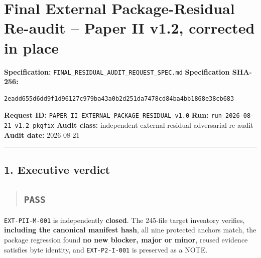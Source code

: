 \documentclass[
  10pt,
]{article}
\author{}
\date{}
\begin{document}
{
\setcounter{tocdepth}{3}
\tableofcontents
}
\section{Final External Package-Residual Re-audit -- Paper II v1.2,
corrected in
place}\label{final-external-package-residual-re-audit-paper-ii-v1.2-corrected-in-place}

\textbf{Specification:}
\texttt{FINAL\_RESIDUAL\_AUDIT\_REQUEST\_SPEC.md} \textbf{Specification
SHA-256:}

\begin{verbatim}
2eadd655d6dd9f1d96127c979ba43a0b2d251da7478cd84ba4bb1868e38cb683
\end{verbatim}

\textbf{Request ID:}
\texttt{PAPER\_II\_EXTERNAL\_PACKAGE\_RESIDUAL\_v1.0} \textbf{Run:}
\texttt{run\_2026-08-21\_v1.2\_pkgfix} \textbf{Audit class:} independent
external residual adversarial re-audit \textbf{Audit date:} 2026-08-21

\begin{center}\rule{0.5\linewidth}{0.5pt}\end{center}

\subsection{1. Executive verdict}\label{executive-verdict}

\begin{quote}
\mbox{}%
\subsection{\texorpdfstring{\texttt{PASS}}{PASS}}\label{pass}
\end{quote}

\texttt{EXT-PII-M-001} is independently \textbf{closed}. The 245-file
target inventory verifies, \textbf{including the canonical manifest
hash}, all nine protected anchors match, the package regression found
\textbf{no new blocker, major or minor}, reused evidence satisfies byte
identity, and \texttt{EXT-P2-I-001} is preserved as a NOTE.
\end{document}
